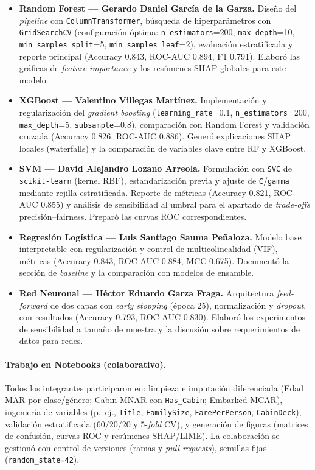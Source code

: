 \documentclass[conference]{IEEEtran}
\begin{document}
\begin{itemize}[leftmargin=*,nosep]
    \item \textbf{Random Forest — Gerardo Daniel García de la Garza.}
    Diseño del \emph{pipeline} con \texttt{ColumnTransformer}, búsqueda de hiperparámetros con \texttt{GridSearchCV} (configuración óptima: \texttt{n\_estimators}=200, \texttt{max\_depth}=10, \texttt{min\_samples\_split}=5, \texttt{min\_samples\_leaf}=2), evaluación estratificada y reporte principal (Accuracy 0.843, ROC-AUC 0.894, F1 0.791). Elaboró las gráficas de \emph{feature importance} y los resúmenes SHAP globales para este modelo.
    
    \item \textbf{XGBoost — Valentino Villegas Martínez.}
    Implementación y regularización del \emph{gradient boosting} (\texttt{learning\_rate}=0.1, \texttt{n\_estimators}=200, \texttt{max\_depth}=5, \texttt{subsample}=0.8), comparación con Random Forest y validación cruzada (Accuracy 0.826, ROC-AUC 0.886). Generó explicaciones SHAP locales (waterfalls) y la comparación de variables clave entre RF y XGBoost.
    
    \item \textbf{SVM — David Alejandro Lozano Arreola.}
    Formulación con \texttt{SVC} de \texttt{scikit-learn} (kernel RBF), estandarización previa y ajuste de \texttt{C}/\texttt{gamma} mediante rejilla estratificada. Reporte de métricas (Accuracy 0.821, ROC-AUC 0.855) y análisis de sensibilidad al umbral para el apartado de \emph{trade-offs} precisión–fairness. Preparó las curvas ROC correspondientes.
    
    \item \textbf{Regresión Logística — Luis Santiago Sauma Peñaloza.}
    Modelo base interpretable con regularización y control de multicolinealidad (VIF), métricas (Accuracy 0.843, ROC-AUC 0.884, MCC 0.675). Documentó la sección de \emph{baseline} y la comparación con modelos de ensamble.
    
    \item \textbf{Red Neuronal — Héctor Eduardo Garza Fraga.}
    Arquitectura \emph{feed-forward} de dos capas con \emph{early stopping} (época 25), normalización y \emph{dropout}, con resultados (Accuracy 0.793, ROC-AUC 0.830). Elaboró los experimentos de sensibilidad a tamaño de muestra y la discusión sobre requerimientos de datos para redes.
\end{itemize}

\paragraph*{Trabajo en Notebooks (colaborativo).}
Todos los integrantes participaron en: limpieza e imputación diferenciada (Edad MAR por clase/género; Cabin MNAR con \texttt{Has\_Cabin}; Embarked MCAR), ingeniería de variables (p.~ej., \texttt{Title}, \texttt{FamilySize}, \texttt{FarePerPerson}, \texttt{CabinDeck}), validación estratificada (60/20/20 y 5-\emph{fold} CV), y generación de figuras (matrices de confusión, curvas ROC y resúmenes SHAP/LIME). La colaboración se gestionó con control de versiones (ramas y \emph{pull requests}), semillas fijas (\texttt{random\_state=42}).
\end{document}
